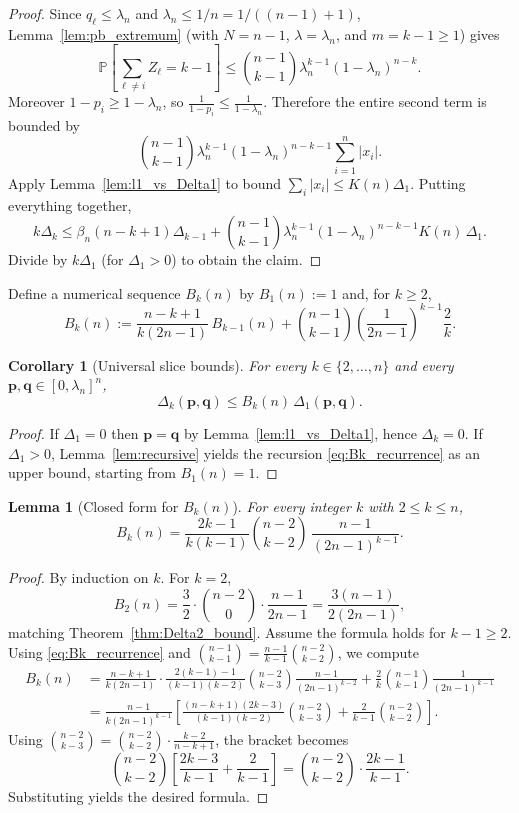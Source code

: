 \documentclass[11pt]{amsart}
\numberwithin{equation}{section}
\newtheorem{lemma}[theorem]{Lemma}
\newtheorem{corollary}[theorem]{Corollary}
\theoremstyle{definition}
\newcommand{\abs}[1]{\left|#1\right|}
\newcommand{\vct}[1]{\mathbf{#1}}
\newcommand{\pvec}{\vct{p}}
\newcommand{\qvec}{\vct{q}}
\newcommand{\lam}{\lambda}
\begin{document}
\begin{proof}
Since $q_\ell\le \lam_n$ and $\lam_n\le 1/n=1/((n-1)+1)$, Lemma~\ref{lem:pb_extremum} (with $N=n-1$, $\lam=\lam_n$, and $m=k-1\ge 1$) gives
\[
\mathbb{P}\!\left[\sum_{\ell\neq i} Z_\ell = k-1\right]
\le \binom{n-1}{k-1}\lam_n^{k-1}(1-\lam_n)^{n-k}.
\]
Moreover $1-p_i\ge 1-\lam_n$, so $\frac{1}{1-p_i}\le \frac{1}{1-\lam_n}$.
Therefore the entire second term is bounded by
\[
\binom{n-1}{k-1}\lam_n^{k-1}(1-\lam_n)^{n-k-1}\sum_{i=1}^n\abs{x_i}.
\]
Apply Lemma~\ref{lem:l1_vs_Delta1} to bound $\sum_i\abs{x_i}\le K(n)\Delta_1$.
Putting everything together,
\[
k\Delta_k
\le \beta_n(n-k+1)\Delta_{k-1}
+\binom{n-1}{k-1}\lam_n^{k-1}(1-\lam_n)^{n-k-1}K(n)\,\Delta_1.
\]
Divide by $k\Delta_1$ (for $\Delta_1>0$) to obtain the claim.
\end{proof}

Define a numerical sequence $B_k(n)$ by $B_1(n):=1$ and, for $k\ge 2$,
\begin{equation}\label{eq:Bk_recurrence}
B_k(n)
:=
\frac{n-k+1}{k(2n-1)}\,B_{k-1}(n)
+
\binom{n-1}{k-1}\left(\frac{1}{2n-1}\right)^{k-1}\frac{2}{k}.
\end{equation}

\begin{corollary}[Universal slice bounds]\label{cor:Delta_k_bound}
For every $k\in\{2,\dots,n\}$ and every $\pvec,\qvec\in[0,\lam_n]^n$,
\[
\Delta_k(\pvec,\qvec)\le B_k(n)\,\Delta_1(\pvec,\qvec).
\]
\end{corollary}

\begin{proof}
If $\Delta_1=0$ then $\pvec=\qvec$ by Lemma~\ref{lem:l1_vs_Delta1}, hence $\Delta_k=0$.
If $\Delta_1>0$, Lemma~\ref{lem:recursive} yields the recursion \eqref{eq:Bk_recurrence} as an upper bound, starting from $B_1(n)=1$.
\end{proof}

\begin{lemma}[Closed form for $B_k(n)$]\label{lem:closed_form_Bk}
For every integer $k$ with $2\le k\le n$,
\[
B_k(n)
=
\frac{2k-1}{k(k-1)}\binom{n-2}{k-2}\,\frac{n-1}{(2n-1)^{k-1}}.
\]
\end{lemma}

\begin{proof}
By induction on $k$.
For $k=2$,
\[
B_2(n)=\frac{3}{2}\cdot\binom{n-2}{0}\cdot\frac{n-1}{2n-1}=\frac{3(n-1)}{2(2n-1)},
\]
matching Theorem~\ref{thm:Delta2_bound}.
Assume the formula holds for $k-1\ge 2$.
Using \eqref{eq:Bk_recurrence} and $\binom{n-1}{k-1}=\frac{n-1}{k-1}\binom{n-2}{k-2}$, we compute
\begin{align*}
B_k(n)
&=
\frac{n-k+1}{k(2n-1)}\cdot
\frac{2(k-1)-1}{(k-1)(k-2)}\binom{n-2}{k-3}\frac{n-1}{(2n-1)^{k-2}}
+\frac{2}{k}\binom{n-1}{k-1}\frac{1}{(2n-1)^{k-1}}\\
&=
\frac{n-1}{k(2n-1)^{k-1}}
\left[
\frac{(n-k+1)(2k-3)}{(k-1)(k-2)}\binom{n-2}{k-3}
+\frac{2}{k-1}\binom{n-2}{k-2}
\right].
\end{align*}
Using $\binom{n-2}{k-3}=\binom{n-2}{k-2}\cdot\frac{k-2}{n-k+1}$, the bracket becomes
\[
\binom{n-2}{k-2}\left[\frac{2k-3}{k-1}+\frac{2}{k-1}\right]
=\binom{n-2}{k-2}\cdot\frac{2k-1}{k-1}.
\]
Substituting yields the desired formula.
\end{proof}
\end{document}
